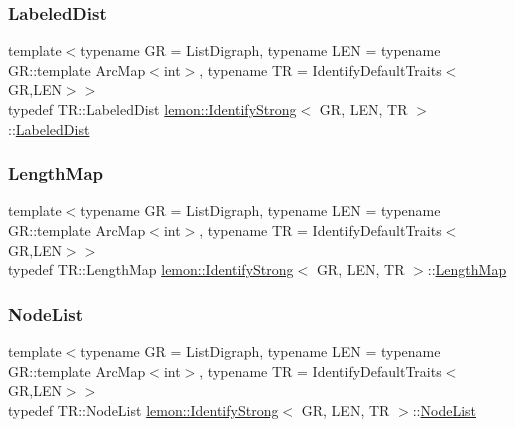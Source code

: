 \mbox{\label{classlemon_1_1_identify_strong_a6b5339bd594571c5085ef41d9ddeafa0}} 
\subsubsection{\texorpdfstring{Labeled\+Dist}{LabeledDist}}
{\footnotesize\ttfamily template$<$typename GR  = List\+Digraph, typename L\+EN  = typename G\+R\+::template Arc\+Map$<$int$>$, typename TR  = Identify\+Default\+Traits$<$\+G\+R,\+L\+E\+N$>$$>$ \\
typedef T\+R\+::\+Labeled\+Dist \hyperlink{classlemon_1_1_identify_strong}{lemon\+::\+Identify\+Strong}$<$ GR, L\+EN, TR $>$\+::\hyperlink{classlemon_1_1_identify_strong_a6b5339bd594571c5085ef41d9ddeafa0}{Labeled\+Dist}}

\mbox{\label{classlemon_1_1_identify_strong_ac2cd2d54ff91cc726fec23ff1534bd0c}} 
\subsubsection{\texorpdfstring{Length\+Map}{LengthMap}}
{\footnotesize\ttfamily template$<$typename GR  = List\+Digraph, typename L\+EN  = typename G\+R\+::template Arc\+Map$<$int$>$, typename TR  = Identify\+Default\+Traits$<$\+G\+R,\+L\+E\+N$>$$>$ \\
typedef T\+R\+::\+Length\+Map \hyperlink{classlemon_1_1_identify_strong}{lemon\+::\+Identify\+Strong}$<$ GR, L\+EN, TR $>$\+::\hyperlink{classlemon_1_1_identify_strong_ac2cd2d54ff91cc726fec23ff1534bd0c}{Length\+Map}}

\mbox{\label{classlemon_1_1_identify_strong_a9c68da1def7665b299ca1896f9bdd59d}} 
\subsubsection{\texorpdfstring{Node\+List}{NodeList}}
{\footnotesize\ttfamily template$<$typename GR  = List\+Digraph, typename L\+EN  = typename G\+R\+::template Arc\+Map$<$int$>$, typename TR  = Identify\+Default\+Traits$<$\+G\+R,\+L\+E\+N$>$$>$ \\
typedef T\+R\+::\+Node\+List \hyperlink{classlemon_1_1_identify_strong}{lemon\+::\+Identify\+Strong}$<$ GR, L\+EN, TR $>$\+::\hyperlink{classlemon_1_1_identify_strong_a9c68da1def7665b299ca1896f9bdd59d}{Node\+List}}

